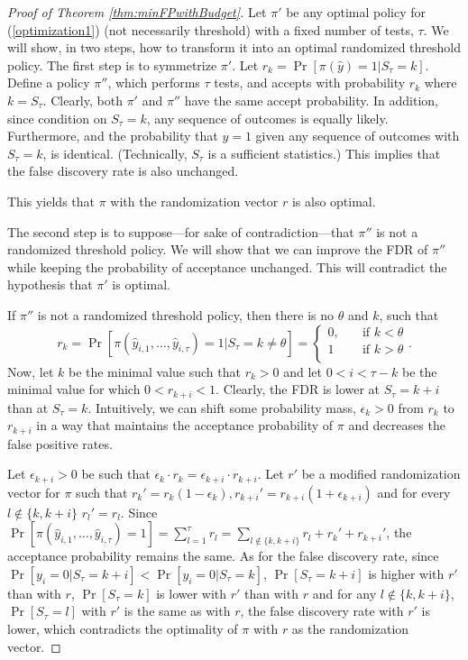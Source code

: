 \begin{proof}[Proof of Theorem \ref{thm:minFPwithBudget}]
Let $\pi'$ be any optimal policy for (\ref{optimization1}) (not necessarily threshold) with a fixed number of tests, $\tau$. 
We will show, in two steps, how to transform it 
into an optimal randomized threshold policy. 
The first step is to symmetrize $\pi'$. 
Let $r_k=\Pr[\pi(\hat{y})=1|S_\tau=k]$. 
Define a policy $\pi''$, which performs $\tau$ tests, 
and accepts with probability $r_k$ where $k=S_\tau$. 
Clearly, 
both $\pi'$ and $\pi''$ have the same accept probability. 
In addition, since condition on $S_\tau=k$, 
any sequence of outcomes is equally likely. 
Furthermore, and the probability that $y=1$ 
given any sequence of outcomes with $S_\tau=k$, is identical. (Technically, $S_\tau$ is a sufficient statistics.) 
This implies that the false discovery rate is also unchanged.

This yields that $\pi$ with the randomization vector $r$ is also optimal.

The second step is to suppose---for sake of contradiction---that $\pi''$ 
is not a randomized threshold policy. 
We will show that we can improve the FDR of $\pi''$ 
while keeping the probability of acceptance unchanged. 
This will contradict the hypothesis that $\pi'$ is optimal. 

If $\pi''$ is not a randomized threshold policy, 
then there is no $\theta$ and $k$, 
such that 
\[
r_k=\Pr[\pi(\hat{y}_{i,1},\dots,\hat{y}_{i,\tau}) =1|S_\tau=k\ne \theta]=
 \begin{cases}
       0, &\quad\text{if } k<\theta \\
       1 &\quad\text{if } k>\theta\\
     \end{cases}.
\] 
Now, let $k$ be the minimal value such that $r_k>0$ 
and let $0<i<\tau-k$ be the minimal value 
for which  $0<r_{k+i}<1$.
Clearly, the FDR is lower at $S_\tau=k+i$ than at $S_\tau=k$.
Intuitively, we can shift some probability mass, $\epsilon_k>0$ from $r_k$ to $r_{k+i}$ 
in a way that maintains the acceptance probability of $\pi$ and decreases the false positive rates.

Let $\epsilon_{k+i}>0$ be such that 
$\epsilon_k\cdot r_k=\epsilon_{k+i}\cdot r_{k+i}$.
Let $r'$ be a modified randomization vector for $\pi$ 
such that $r_k'=r_k(1-\epsilon_k), r_{k+i}'= r_{k+i}(1+\epsilon_{k+i})$ 
and for every $l\notin \{k,k+i\}$ $r_l'=r_l$. 
Since $\Pr[\pi(\hat{y}_{i,1},\dots,\hat{y}_{i,\tau}) =1]=\sum_{l=1}^\tau r_l=\sum_{l\notin \{k,k+i\}} r_l+r_k'+r_{k+i}'$, 
the acceptance probability remains the same. 
As for the false discovery rate, since
$\Pr[y_i=0|S_\tau=k+i]<\Pr[y_i=0|S_\tau=k]$, 
$\Pr[S_\tau=k+i]$ is higher with $r'$ than with $r$, $\Pr[S_\tau=k]$ is lower with $r'$  than with $r$ 
and for any $l\notin \{k,k+i\}$, 
$\Pr[S_\tau=l]$ with $r'$ is the same as with $r$, 
the false discovery rate with $r'$ is lower, 
which contradicts the optimality of $\pi$ 
with $r$ as the randomization vector.
\end{proof}

